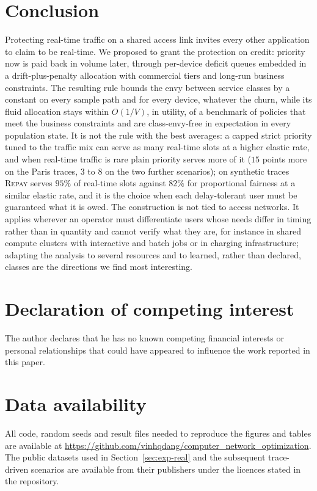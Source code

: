 \documentclass[preprint,11pt]{elsarticle}
\theoremstyle{definition}
\theoremstyle{remark}
\newcommand{\repay}{\textsc{Repay}}
\begin{document}
\section{Conclusion}\label{sec:conclusion}

Protecting real-time traffic on a shared access link invites every other application to claim to be real-time.
We proposed to grant the protection on credit: priority now is paid back in volume later, through per-device deficit queues embedded in a drift-plus-penalty allocation with commercial tiers and long-run business constraints.
The resulting rule bounds the envy between service classes by a constant on every sample path and for every device, whatever the churn, while its fluid allocation stays within $O(1/V)$, in utility, of a benchmark of policies that meet the business constraints and are class-envy-free in expectation in every population state.
It is not the rule with the best averages: a capped strict priority tuned to the traffic mix can serve as many real-time slots at a higher elastic rate, and when real-time traffic is rare plain priority serves more of it ($15$ points more on the Paris traces, $3$ to $8$ on the two further scenarios); on synthetic traces \repay{} serves $95\%$ of real-time slots against $82\%$ for proportional fairness at a similar elastic rate, and it is the choice when each delay-tolerant user must be guaranteed what it is owed.
The construction is not tied to access networks.
It applies wherever an operator must differentiate users whose needs differ in timing rather than in quantity and cannot verify what they are, for instance in shared compute clusters with interactive and batch jobs or in charging infrastructure; adapting the analysis to several resources and to learned, rather than declared, classes are the directions we find most interesting.


\section*{Declaration of competing interest}
The author declares that he has no known competing financial interests or personal relationships that could have appeared to influence the work reported in this paper.

\section*{Data availability}
All code, random seeds and result files needed to reproduce the figures and tables are available at \url{https://github.com/vinhqdang/computer_network_optimization}. The public datasets used in Section~\ref{sec:exp-real} and the subsequent trace-driven scenarios are available from their publishers under the licences stated in the repository.
\end{document}
